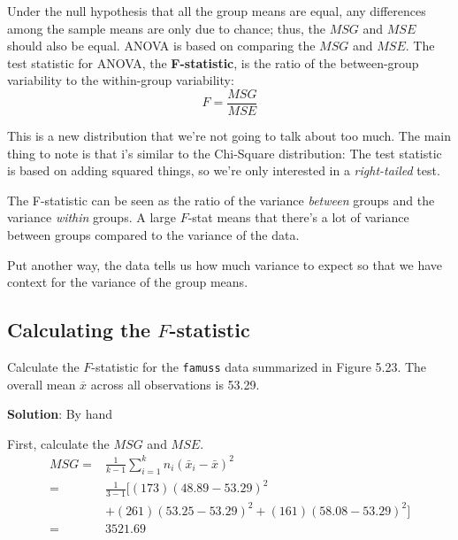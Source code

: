 \documentclass[
  letterpaper,
  DIV=11,
  numbers=noendperiod,
  oneside]{scrreprt}
\begin{document}
Under the null hypothesis that all the group means are equal, any
differences among the sample means are only due to chance; thus, the
\(MSG\) and \(MSE\) should also be equal. ANOVA is based on comparing
the \(MSG\) and \(MSE\). The test statistic for ANOVA, the
\textbf{F-statistic}, is the ratio of the between-group variability to
the within-group variability: \[
F = \frac{MSG}{MSE}
\]

This is a new distribution that we're not going to talk about too much.
The main thing to note is that i's similar to the Chi-Square
distribution: The test statistic is based on adding squared things, so
we're only interested in a \emph{right-tailed} test.

\begin{tcolorbox}[enhanced jigsaw, toprule=.15mm, colbacktitle=quarto-callout-warning-color!10!white, title=\textcolor{quarto-callout-warning-color}{\faExclamationTriangle}\hspace{0.5em}{The \(F\)-Statistic}, arc=.35mm, colframe=quarto-callout-warning-color-frame, colback=white, titlerule=0mm, left=2mm, bottomtitle=1mm, bottomrule=.15mm, breakable, opacitybacktitle=0.6, leftrule=.75mm, toptitle=1mm, coltitle=black, rightrule=.15mm, opacityback=0]

The F-statistic can be seen as the ratio of the variance \emph{between}
groups and the variance \emph{within} groups. A large \(F\)-stat means
that there's a lot of variance between groups compared to the variance
of the data.

Put another way, the data tells us how much variance to expect so that
we have context for the variance of the group means.

\end{tcolorbox}

\hypertarget{calculating-the-f-statistic}{%
\subsection{\texorpdfstring{Calculating the
\(F\)-statistic}{Calculating the F-statistic}}\label{calculating-the-f-statistic}}

Calculate the \(F\)-statistic for the \texttt{famuss} data summarized in
Figure 5.23. The overall mean \(\overline{x}\) across all observations
is 53.29.

\textbf{Solution}: By hand

First, calculate the \(MSG\) and \(MSE\). \vspace{0mm} \begin{align*}
MSG =& \frac{1}{k-1}\sum_{i=1}^{k} n_{i}\left(\bar{x}_{i} - \bar{x}\right)^{2} \\
=& \frac{1}{3-1} [(173)(48.89 - 53.29)^{2} \\&+ (261)(53.25 - 53.29)^{2} + (161)(58.08 - 53.29)^{2} ]\\
=& 3521.69
\end{align*}
\end{document}
